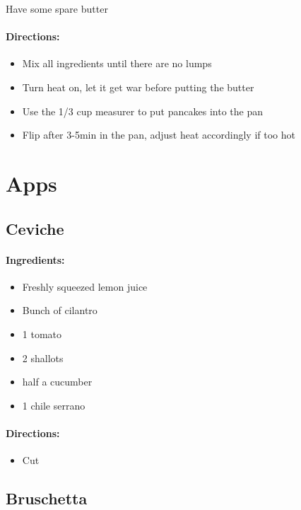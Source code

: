 \documentclass{article}
\begin{document}
Have some spare butter

\paragraph{Directions:}
\begin{itemize}
	\item Mix all ingredients until there are no lumps 
	\item Turn heat on, let it get war before putting the butter 
	\item Use the 1/3 cup measurer to put pancakes into the pan 
	\item Flip after 3-5min in the pan, adjust heat accordingly if too hot
\end{itemize}

\section{Apps}

\subsection{Ceviche}

\paragraph{Ingredients:}

\begin{itemize}
	\item Freshly squeezed lemon juice
	\item Bunch of cilantro
	\item 1 tomato
	\item 2 shallots
	\item half a cucumber
	\item 1 chile serrano 
\end{itemize}

\paragraph{Directions:}
\begin{itemize}
	\item Cut
\end{itemize}

\subsection{Bruschetta}
\end{document}
